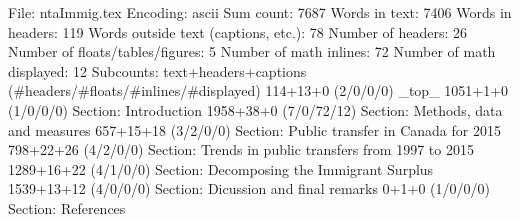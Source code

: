 File: ntaImmig.tex
Encoding: ascii
Sum count: 7687
Words in text: 7406
Words in headers: 119
Words outside text (captions, etc.): 78
Number of headers: 26
Number of floats/tables/figures: 5
Number of math inlines: 72
Number of math displayed: 12
Subcounts:
  text+headers+captions (#headers/#floats/#inlines/#displayed)
  114+13+0 (2/0/0/0) _top_
  1051+1+0 (1/0/0/0) Section: Introduction
  1958+38+0 (7/0/72/12) Section: Methods, data and measures 
  657+15+18 (3/2/0/0) Section: Public transfer in Canada for 2015
  798+22+26 (4/2/0/0) Section: Trends in public transfers from 1997 to 2015
  1289+16+22 (4/1/0/0) Section: Decomposing the Immigrant Surplus
  1539+13+12 (4/0/0/0) Section: Dicussion and final remarks
  0+1+0 (1/0/0/0) Section: References

